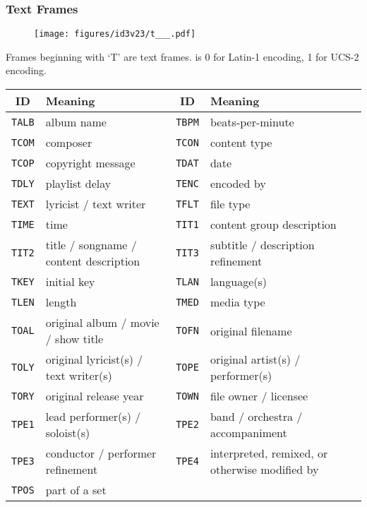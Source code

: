 \subsubsection{Text Frames}
\begin{figure}[h]
  \texttt{[image: figures/id3v23/t\_\_\_.pdf]}
\end{figure}
\par
\noindent
Frames beginning with `T' are text frames.
 is 0 for Latin-1 encoding, 1 for UCS-2 encoding.
\begin{table}[h]
  {
    \begin{tabular}{|c|l||c|l|}
      \hline
      ID & Meaning & ID & Meaning \\
      \hline
      \texttt{TALB} & album name &
      \texttt{TBPM} & beats-per-minute \\
      \texttt{TCOM} & composer &
      \texttt{TCON} & content type \\
      \texttt{TCOP} & copyright message &
      \texttt{TDAT} & date \\
      \texttt{TDLY} & playlist delay &
      \texttt{TENC} & encoded by \\
      \texttt{TEXT} & lyricist / text writer &
      \texttt{TFLT} & file type \\
      \texttt{TIME} & time &
      \texttt{TIT1} & content group description \\
      \texttt{TIT2} & title / songname / content description &
      \texttt{TIT3} & subtitle / description refinement \\
      \texttt{TKEY} & initial key &
      \texttt{TLAN} & language(s) \\
      \texttt{TLEN} & length &
      \texttt{TMED} & media type \\
      \texttt{TOAL} & original album / movie / show title &
      \texttt{TOFN} & original filename \\
      \texttt{TOLY} & original lyricist(s) / text writer(s) &
      \texttt{TOPE} & original artist(s) / performer(s) \\
      \texttt{TORY} & original release year &
      \texttt{TOWN} & file owner / licensee \\
      \texttt{TPE1} & lead performer(s) / soloist(s) &
      \texttt{TPE2} & band / orchestra / accompaniment \\
      \texttt{TPE3} & conductor / performer refinement &
      \texttt{TPE4} & interpreted, remixed, or otherwise modified by \\
      \texttt{TPOS} & part of a set &

\end{tabular}}
\end{table}
